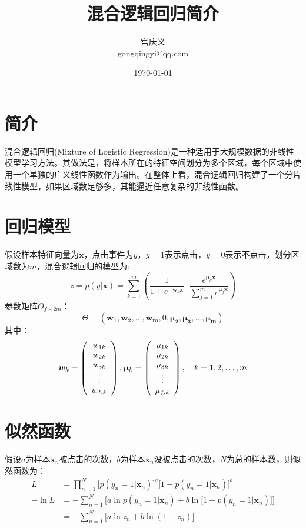 \documentclass[UTF8,10pt, twoside]{article}
\title{混合逻辑回归简介}
\author{宫庆义\\gongqingyi@qq.com}
\date{\today}
\begin{document}
 
 	\pagestyle{empty}
 	\maketitle                         %
 	\thispagestyle{empty}
 	\newpage
   
\section{简介}
混合逻辑回归(Mixture of Logistic Regression)是一种适用于大规模数据的非线性模型学习方法。其做法是，将样本所在的特征空间划分为多个区域，每个区域中使用一个单独的广义线性函数作为输出。在整体上看，混合逻辑回归构建了一个分片线性模型，如果区域数足够多，其能逼近任意复杂的非线性函数。
\section{回归模型}
假设样本特征向量为\(\bm{x}\)，点击事件为\(y\)，\(y=1\)表示点击，\(y=0\)表示不点击，划分区域数为\(m\)，混合逻辑回归的模型为:
\begin{equation}
z=p(y|\bm{x}) = \sum_{k=1}^{m}\left(\frac{1}{1+e^{-\bm{w}_k\bm{x}}}\cdot\frac{e^{\bm{\mu}_k\bm{x}}}{\sum\limits_{j=1}^{m}e^{\bm{\mu}_j\bm{x}}}\right)
\end{equation}
参数矩阵\(\Theta_{f \times 2m}\)：
\begin{equation}
\Theta=\left(\bm{w_1}, \bm{w_2},\ldots ,\bm{w_m}, 0, \bm{\mu_2},\bm{\mu_3},\ldots,\bm{\mu_m}\right)
\end{equation}
其中：
\begin{equation}
\bm{w}_k = \left( \begin{array}{c}  w_{1k}\cr w_{2k}\cr w_{3k}\cr\vdots\cr w_{f, k} \end{array}\right),
\bm{\mu}_k =\left( \begin{array}{c} 
 \mu_{1k}\cr\mu_{2k}\cr\mu_{3k}\cr\vdots\cr\mu_{f,k} \end{array}\right), \quad
k=1,2,\ldots,m 
\end{equation}
\section{似然函数}
假设\(a\)为样本\(\bm{x}_n\)被点击的次数，\(b\)为样本\(\bm{x}_n\)没被点击的次数，\(N\)为总的样本数，则似然函数为：
\begin{equation}
 \begin{aligned}   
	L&=\prod_{n=1}^{N}\Big[p(y_n=1|\bm{x}_n)\Big]^a
	\Big[1-p(y_n=1|\bm{x}_n)\Big]^b \\
	-\ln L&=-\sum_{n=1}^N\Big[ a\ln p(y_n=1|\bm{x}_n)+b\ln\big[1-p(y_n=1|\bm{x}_n)\big]\Big]\\
	&=-\sum_{n=1}^N\Big[ a\ln z_n + b\ln(1-z_n)\Big]
 \end{aligned}
\end{equation}
\end{document}
